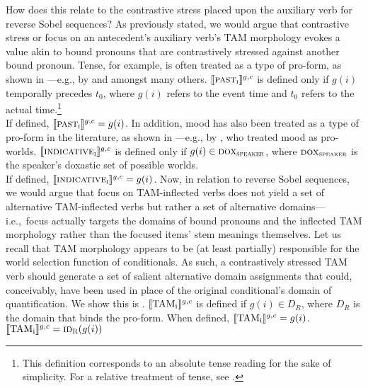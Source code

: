 How does this relate to the contrastive stress placed upon the auxiliary verb for reverse Sobel sequences? As previously stated, we would argue that contrastive stress or focus on an antecedent's auxiliary verb's TAM morphology evokes a value akin to bound pronouns that are contrastively stressed against another bound pronoun. Tense, for example, is often treated as a type of pro-form, as shown in ---e.g., by \textcite{Partee1973} and \textcite{Kratzer1998} amongst many others.
\ex 
$\intension[g,c]{\scshape past\textsubscript{i}}$ is defined only if $g(i)$ temporally precedes $t_0$, where $g(i)$ refers to the event time and $t_0$ refers to the actual time.\footnote{This definition corresponds to an absolute tense reading for the sake of simplicity. For a relative treatment of tense, see \textcite{Kusumoto1999}.}\\If defined, $\intension[g,c]{\scshape past\textsubscript{i}}=g(i)$\hfill\parencite[adapted from][p.~378]{Romero2017}.
\xe
In addition, mood has also been treated as a type of pro-form in the literature, as shown in ---e.g., by \textcite{Schlenker2004,Schlenker2005}, who treated mood as pro-worlds.
\ex
$\intension[g,c]{\scshape indicative\textsubscript{i}}$ is defined only if $g(i)\in\predicate{dox\textsubscript{speaker}}$, where $\predicate{dox\textsubscript{speaker}}$ is the speaker's doxastic set of possible worlds.\\If defined, $\intension[g,c]{\scshape indicative\textsubscript{i}}=g(i)$\hfill\parencite[adapted from][p.~379]{Romero2017}.
\xe
Now, in relation to reverse Sobel sequences, we would argue that focus on TAM-inflected verbs does not yield a set of alternative TAM-inflected verbs but rather a set of alternative domains---i.e.,~focus actually targets the domains of bound pronouns and the inflected TAM morphology rather than the focused items' stem meanings themselves. %
Let us recall that TAM morphology appears to be (at least partially) responsible for the world selection function of conditionals. As such, a contrastively stressed TAM verb should generate a set of salient alternative domain assignments that could, conceivably, have been used in place of the original conditional's domain of quantification. We show this is .
\pex\label{def:tam}
\a $\intension[g,c]{TAM\textsubscript{i}}$ is defined if $g(i)\in{D_R}$, where $D_R$ is the domain that binds the pro-form. When defined, $\intension[g,c]{TAM\textsubscript{i}}=g(i)$.
\a $\intension[g,c]{TAM\textsubscript{i}}=\predicate{id\textsubscript{R}}(g(i))$
